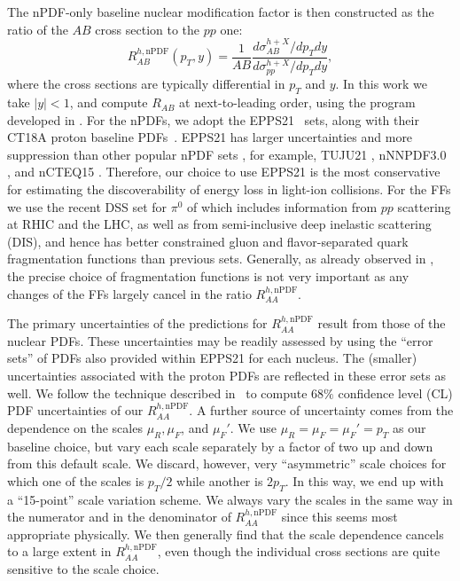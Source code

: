 \documentclass[%
 reprint,
 amsmath,amssymb,
 aps,
 prl,nofootinbib,
 superscriptaddress
]{revtex4-2}
\begin{document}
The nPDF-only baseline nuclear modification factor is then constructed as the ratio of the $AB$ cross section to the $pp$ one:
\begin{equation}
	R_{AB}^{h, \text{nPDF}}(p_T, y) = \frac{1}{A B} \frac{d \sigma_{AB}^{h + X} /d p_T dy}{d \sigma_{pp}^{h + X} / d p_T dy},
	\label{eqn:raa_npdf_nn}
\end{equation}
where the cross sections are typically differential in $p_T$ and $y$. In this work we take $|y| < 1$, and compute $R_{AB}$ at next-to-leading order, using the program developed in \cite{Jager:2002xm}. For the nPDFs, we adopt the EPPS21~\cite{Buckley:2014ana,Eskola:2021nhw} sets, along with their CT18A proton baseline PDFs~\cite{Hou:2019efy}. 
EPPS21 has larger uncertainties and more suppression than other popular nPDF sets \cite{Mazeliauskas:2025clt}, for example, TUJU21 \cite{Helenius:2021tof}, nNNPDF3.0 \cite{AbdulKhalek:2022fyi}, and nCTEQ15 \cite{Kusina:2015vfa}. Therefore, our choice to use EPPS21 is the most conservative for estimating the discoverability of energy loss in light-ion collisions.
For the FFs we use the recent DSS set for $\pi^0$ of \cite{Borsa:2021ran} which includes information from $pp$ scattering at RHIC and the LHC, as well as from semi-inclusive deep inelastic scattering (DIS), and hence has better constrained gluon and flavor-separated quark fragmentation functions than previous sets. Generally, as already observed in \cite{Huss:2020dwe,Huss:2020whe}, the precise choice of fragmentation functions is not very important as any changes of the FFs largely cancel in the ratio $R_{AA}^{h, \text{nPDF}}$. %


The primary uncertainties of the predictions for $R_{AA}^{h, \text{nPDF}}$ result from those of the nuclear PDFs. These uncertainties may be readily assessed by using the ``error sets'' of PDFs also provided within EPPS21 for each nucleus. The (smaller) uncertainties associated with the proton PDFs are reflected in these error sets as well. We follow the technique described in~\cite{Eskola:2021nhw} to compute $68\%$ confidence level (CL) PDF uncertainties of our $R_{AA}^{h, \text{nPDF}}$. A further source of uncertainty comes from the dependence on the scales $\mu_R,\mu_F$, and $\mu_F'$. We use $\mu_R=\mu_F=\mu_F'=p_T$ as our baseline choice, but vary each scale separately by a factor of two up and down from this default scale. We discard, however, very ``asymmetric'' scale choices for which one of the scales is $p_T/2$ while another is $2p_T$. In this way, we end up with a ``15-point'' scale variation scheme. We always vary the scales in the same way in the numerator and in the denominator of $R_{AA}^{h, \text{nPDF}}$ since this seems most appropriate physically. We then generally find that the scale dependence cancels to a large extent in $R_{AA}^{h, \text{nPDF}}$, even though the individual cross sections are quite sensitive to the scale choice.
\end{document}
